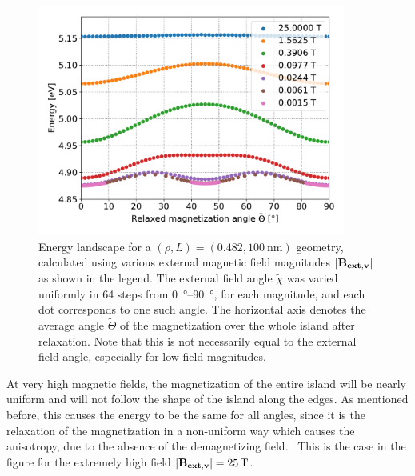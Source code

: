 \documentclass[11pt,a4paper,english]{article}
\begin{document}
\begin{figure}
    \centering
    \includegraphics[width=0.9\textwidth]{Figures/biaxial_island/BarrierLandscape/Plus_48.2_B25-0.001-div4_a128Pi_plotOptimized.pdf}
    \caption{Energy landscape for a $(\rho, L)=(0.482, \SI{100}{\nano\metre})$ geometry, calculated using various external magnetic field magnitudes $\abs{\vb{B_{ext,v}}}$ as shown in the legend. The external field angle $\widetilde{\chi}$ was varied uniformly in 64 steps from \SIrange{0}{90}{\degree}, for each magnitude, and each dot corresponds to one such angle. The horizontal axis denotes the average angle $\widetilde{\Theta}$ of the magnetization over the whole island after relaxation. Note that this is not necessarily equal to the external field angle, especially for low field magnitudes.}
    \label{fig:barrierLandscape-sweepBext_r0.482}
\end{figure}
At very high magnetic fields, the magnetization of the entire island will be nearly uniform and will not follow the shape of the island along the edges. As mentioned before, this causes the energy to be the same for all angles, since it is the relaxation of the magnetization in a non-uniform way which causes the anisotropy, due to the absence of the demagnetizing field.~\cite{Nonmonotonic_reversal} This is the case in the figure for the extremely high field $\abs{\vb{B_{ext,v}}}=\SI{25}{\tesla}$. \par
\end{document}
